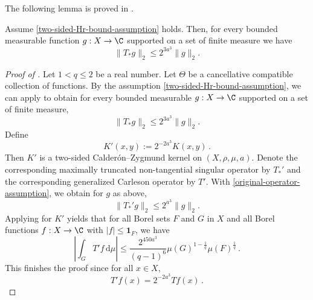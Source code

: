 The following lemma is proved in .
\begin{lemma}\label{nontangential-from-simple}
    \leanok
    Assume \eqref{two-sided-Hr-bound-assumption} holds.
    Then, for every bounded measurable function $g : X \to \C$ supported on a set of finite measure we have
    \begin{equation}\label{concretetstarbound}
        \|T_*g\|_2\le 2^{3a^3}\|g\|_2.
    \end{equation}
\end{lemma}

\begin{proof}[Proof of ]
    \leanok
    Let $1<q\le 2$ be a real number. Let $\Theta$ be a cancellative compatible collection of functions.
    By the assumption \eqref{two-sided-Hr-bound-assumption}, we can apply  to obtain for every bounded measurable $g:X\to\C$ supported on a set of finite measure,
    \begin{equation}\label{original-operator-assumption}
        \|T_*g\|_2\le 2^{3a^3}\|g\|_2.
    \end{equation}
    Define
    \begin{equation*}
        K'(x,y):= 2^{-2a^3} K(x,y) \,.
    \end{equation*}
    Then $K'$ is a two-sided Calder\'on--Zygmund kernel on $(X,\rho,\mu,a)$. Denote the corresponding maximally truncated non-tangential singular operator by $T_*'$ and the corresponding generalized Carleson operator by $T'$.
    With \eqref{original-operator-assumption}, we obtain for $g$ as above,
    \begin{equation}\label{modified-operator-assumption}
        \|T_*'g\|_2\le 2^{a^3}\|g\|_2.
    \end{equation}
    Applying  for $K'$ yields that for all Borel sets $F$ and $G$ in $X$ and
    all Borel functions $f:X\to \C$ with
    $|f|\le \mathbf{1}_F$, we have
    \begin{equation*}
        \left|\int_{G} T' f \, \mathrm{d}\mu\right| \leq \frac{2^{450a^3}}{(q-1)^6} \mu(G)^{1-\frac{1}{q}} \mu(F)^{\frac{1}{q}}\, .
    \end{equation*}
    This finishes the proof since for all $x\in X$,
    \begin{equation*}
        T'f(x) = 2^{-2a^3} Tf(x) \,.
    \end{equation*}
\end{proof}

